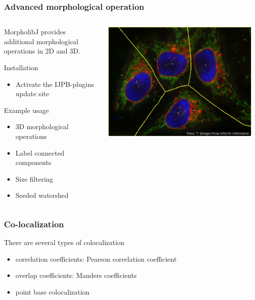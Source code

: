 \documentclass[ignorenonframetext,aspectratio=169,10pt,xcolor=table]{beamer}
\begin{document}
\begin{frame} \frametitle{Advanced morphological operation}
  \begin{columns}
    \begin{column}{0.65\textwidth}
  MorpholibJ provides additional morphological operations in 2D and 3D.
  \begin{block}{Installation}
    \begin{itemize}
    \item Activate the IJPB-plugins update site
    \end{itemize}
  \end{block}
  \begin{block}{Example usage}
    \begin{itemize}
      \item 3D morphological operations
      \item Label connected components
      \item Size filtering
      \item Seeded watershed
      \end{itemize}
  \end{block}
\end{column}
\begin{column}{0.35\textwidth}
  \includegraphics[width=\textwidth]{seeded_watershed}
\end{column}
\end{columns}
\end{frame}


\begin{frame} \frametitle{Co-localization}
  There are several types of colocalization
  \begin{itemize}
    \item correlation coefficients: Pearson correlation coefficient
    \item overlap  coefficients: Manders coefficients
    \item point base colocalization
  \end{itemize}

\end{frame}
\end{document}
